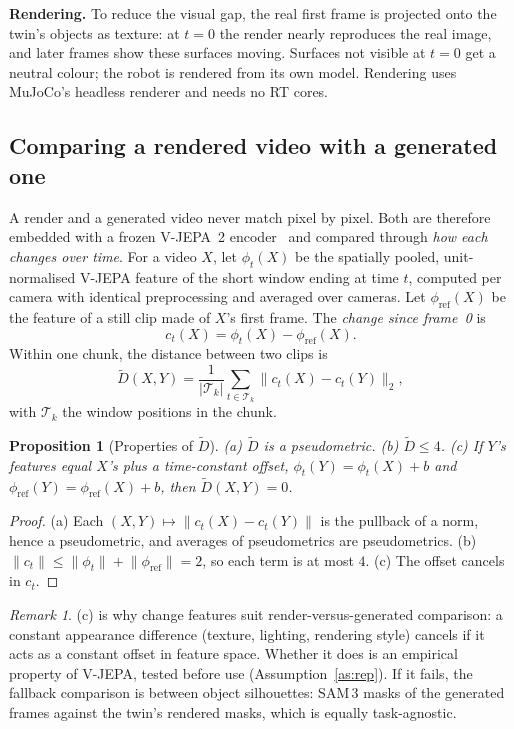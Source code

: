 \documentclass[11pt,a4paper]{article}
\theoremstyle{plain}
\newtheorem{proposition}{Proposition}
\theoremstyle{definition}
\theoremstyle{remark}
\newtheorem*{remark}{Remark}
\newcommand{\Dt}{\tilde D}
\begin{document}
\textbf{Rendering.} To reduce the visual gap, the real first frame is projected onto the twin's objects as texture: at $t=0$ the render nearly reproduces the real image, and later frames show these surfaces moving. Surfaces not visible at $t=0$ get a neutral colour; the robot is rendered from its own model. Rendering uses MuJoCo's headless renderer and needs no RT cores.

\subsection{Comparing a rendered video with a generated one}\label{sec:compare}
A render and a generated video never match pixel by pixel. Both are therefore embedded with a frozen V-JEPA~2 encoder~\cite{vjepa2} and compared through \emph{how each changes over time}. For a video $X$, let $\phi_t(X)$ be the spatially pooled, unit-normalised V-JEPA feature of the short window ending at time $t$, computed per camera with identical preprocessing and averaged over cameras. Let $\phi_{\mathrm{ref}}(X)$ be the feature of a still clip made of $X$'s first frame. The \emph{change since frame~0} is
\begin{equation}\label{eq:change}
c_t(X)=\phi_t(X)-\phi_{\mathrm{ref}}(X).
\end{equation}
Within one chunk, the distance between two clips is
\begin{equation}\label{eq:dt}
\Dt(X,Y)=\frac{1}{|\mathcal T_k|}\sum_{t\in\mathcal T_k}\big\lVert c_t(X)-c_t(Y)\big\rVert_2,
\end{equation}
with $\mathcal T_k$ the window positions in the chunk.

\begin{proposition}[Properties of $\Dt$]\label{prop:dt}
(a) $\Dt$ is a pseudometric. (b) $\Dt\le4$. (c) If $Y$'s features equal $X$'s plus a time-constant offset, $\phi_t(Y)=\phi_t(X)+b$ and $\phi_{\mathrm{ref}}(Y)=\phi_{\mathrm{ref}}(X)+b$, then $\Dt(X,Y)=0$.
\end{proposition}
\begin{proof}
(a) Each $(X,Y)\mapsto\lVert c_t(X)-c_t(Y)\rVert$ is the pullback of a norm, hence a pseudometric, and averages of pseudometrics are pseudometrics. (b) $\lVert c_t\rVert\le\lVert\phi_t\rVert+\lVert\phi_{\mathrm{ref}}\rVert=2$, so each term is at most $4$. (c) The offset cancels in $c_t$.
\end{proof}
\begin{remark}
(c) is why change features suit render-versus-generated comparison: a constant appearance difference (texture, lighting, rendering style) cancels if it acts as a constant offset in feature space. Whether it does is an empirical property of V-JEPA, tested before use (Assumption~\ref{as:rep}). If it fails, the fallback comparison is between object silhouettes: SAM\,3 masks of the generated frames against the twin's rendered masks, which is equally task-agnostic.
\end{remark}
\end{document}
